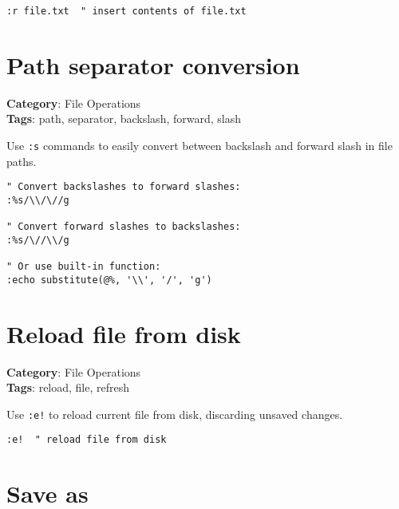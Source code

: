 {{{{{\begin{Exa*}{}
\begin{Verbatim}[fontsize=\footnotesize, breaklines, breakanywhere]
:r file.txt  " insert contents of file.txt
\end{Verbatim}
\end{Exa*}

\section{Path separator conversion}

\textbf{Category}: File Operations\\ \textbf{Tags}: path, separator, backslash, forward, slash
\vspace{0.5cm}

Use {\footnotesize \Verb§:s§} commands to easily convert between backslash and forward slash in file paths.

\begin{Exa*}{}
\begin{Verbatim}[fontsize=\footnotesize, breaklines, breakanywhere]
" Convert backslashes to forward slashes:
:%s/\\/\//g

" Convert forward slashes to backslashes:
:%s/\//\\/g

" Or use built-in function:
:echo substitute(@%, '\\', '/', 'g')
\end{Verbatim}
\end{Exa*}

\section{Reload file from disk}

\textbf{Category}: File Operations\\ \textbf{Tags}: reload, file, refresh
\vspace{0.5cm}

Use {\footnotesize \Verb§:e!§} to reload current file from disk, discarding unsaved changes.

\begin{Exa*}{}
\begin{Verbatim}[fontsize=\footnotesize, breaklines, breakanywhere]
:e!  " reload file from disk
\end{Verbatim}
\end{Exa*}

\section{Save as}

}}}}}
